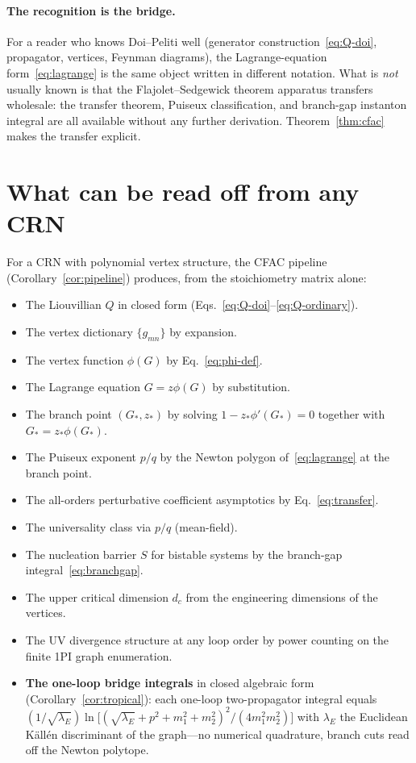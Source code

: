 \documentclass[11pt,a4paper]{article}
\theoremstyle{plain}
\theoremstyle{definition}
\begin{document}
\paragraph{The recognition is the bridge.}
For a reader who knows Doi--Peliti well (generator
construction~\eqref{eq:Q-doi}, propagator, vertices, Feynman
diagrams), the Lagrange-equation form~\eqref{eq:lagrange} is the
same object written in different notation.  What is \emph{not}
usually known is that the Flajolet--Sedgewick theorem apparatus
transfers wholesale: the transfer theorem, Puiseux classification,
and branch-gap instanton integral are all available without any
further derivation.  Theorem~\ref{thm:cfac} makes the transfer
explicit.

\section{What can be read off from any CRN}
\label{sec:readoff}

For a CRN with polynomial vertex structure, the CFAC pipeline
(Corollary~\ref{cor:pipeline}) produces, from the stoichiometry
matrix alone:

\begin{itemize}[leftmargin=1.5em, itemsep=-0.2em]
\item The Liouvillian $Q$ in closed form
  (Eqs.~\eqref{eq:Q-doi}--\eqref{eq:Q-ordinary}).
\item The vertex dictionary $\{g_{m n}\}$ by expansion.
\item The vertex function $\phi(G)$ by Eq.~\eqref{eq:phi-def}.
\item The Lagrange equation $G = z\phi(G)$ by substitution.
\item The branch point $(G_*, z_*)$ by solving
  $1 - z_*\phi'(G_*) = 0$ together with $G_* = z_*\phi(G_*)$.
\item The Puiseux exponent $p/q$ by the Newton polygon
  of~\eqref{eq:lagrange} at the branch point.
\item The all-orders perturbative coefficient asymptotics
  by Eq.~\eqref{eq:transfer}.
\item The universality class via $p/q$ (mean-field).
\item The nucleation barrier $S$ for bistable systems
  by the branch-gap integral~\eqref{eq:branchgap}.
\item The upper critical dimension $d_c$ from the engineering
  dimensions of the vertices.
\item The UV divergence structure at any loop order by
  power counting on the finite 1PI graph enumeration.
\item \textbf{The one-loop bridge integrals} in closed algebraic
  form (Corollary~\ref{cor:tropical}): each one-loop two-propagator
  integral equals
  $(1/\sqrt{\lambda_E})\ln\!\bigl[(\sqrt{\lambda_E}+p^2+m_1^2+m_2^2)^2/(4m_1^2m_2^2)\bigr]$
  with $\lambda_E$ the Euclidean K\"all\'en discriminant of the
  graph---no numerical quadrature, branch cuts read off the Newton
  polytope.
\end{itemize}
\end{document}
